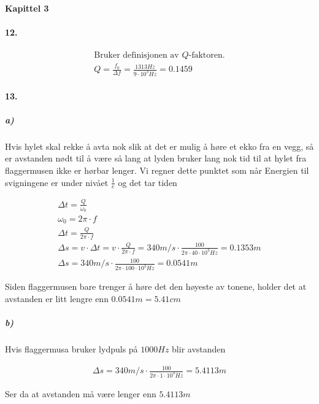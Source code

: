 \documentclass[11pt, A4paper,norsk]{article}
\begin{document}
	\begin{flushleft}
\textbf{Kapittel 3}
	\end{flushleft}
		\paragraph{12.}
			\begin{gather*}
\text{Bruker definisjonen av $Q$-faktoren.} \\
Q = \frac{f_0}{\Delta f} = \frac{1313 Hz}{9 \cdot 10^3 Hz} = 0.1459
			\end{gather*}









		\paragraph{13.}
			\subparagraph{a)}
				\begin{flushleft}
Hvis hylet skal rekke å avta nok slik at det er mulig å høre et ekko fra en vegg, så er avstanden nødt til å være så lang at lyden bruker lang nok tid til at hylet fra flaggermusen ikke er hørbar lenger. Vi regner dette punktet som når Energien til svigningene er under nivået $\frac{1}{e}$ og det tar tiden
				\end{flushleft}
				\begin{gather*}
\Delta t = \frac{Q}{\omega_0} \\
\omega_0 = 2 \pi \cdot f \\
\Delta t = \frac{Q}{2 \pi \cdot f} \\
\Delta s = v \cdot \Delta t = v \cdot \frac{Q}{2 \pi \cdot f} = 340 m/s \cdot \frac{100}{2 \pi \cdot 40 \cdot 10^3 Hz} = 0.1353 m \\
\Delta s = 340 m/s \cdot \frac{100}{2 \pi \cdot 100 \cdot 10^3 Hz} = 0.0541 m
				\end{gather*}
				\begin{flushleft}
Siden flaggermusen bare trenger å høre det den høyeste av tonene, holder det at avstanden er litt lengre enn $0.0541 m = 5.41 cm$
				\end{flushleft}









			\subparagraph{b)}
				\begin{flushleft}
Hvis flaggermusa bruker lydpuls på $1000 Hz$ blir avstanden
				\end{flushleft}
				\begin{gather*}
\Delta s = 340 m/s \cdot \frac{100}{2 \pi \cdot 1 \cdot 10^3 Hz} = 5.4113 m
				\end{gather*}
				\begin{flushleft}
Ser da at avstanden må være lenger enn $5.4113 m$
				\end{flushleft}
\end{document}
